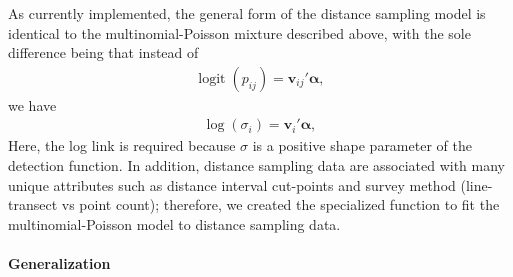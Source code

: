 \documentclass[article,shortnames]{jss}
\DeclareMathOperator{\logit}{logit}
\begin{document}
As currently implemented, the general form of the distance sampling model
is identical to the multinomial-Poisson mixture described above, with the
sole difference being that instead of
\begin{gather}
  \logit(p_{ij}) = \mathbf v_{ij}' \mathbf \alpha,
\end{gather}
we have
\begin{gather}
  \log(\sigma_i) = \mathbf v_{i}' \mathbf \alpha,
\end{gather}
Here, the log link is required because $\sigma$ is a positive shape parameter
of the detection function. In addition, distance sampling data 
are associated with many unique attributes such as distance interval 
cut-points and survey method (line-transect vs point count); therefore, 
we created the specialized function  to fit the 
multinomial-Poisson model to distance sampling data.


\paragraph{Generalization}
\end{document}
